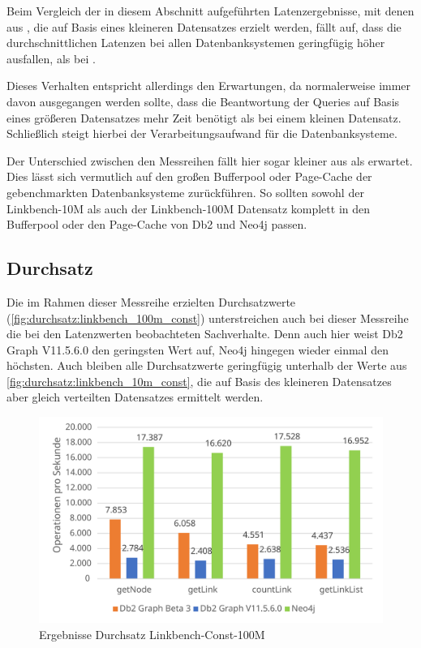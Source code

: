 Beim Vergleich der in diesem Abschnitt aufgeführten Latenzergebnisse, mit denen aus , die auf Basis eines kleineren Datensatzes erzielt werden, fällt auf, dass die durchschnittlichen Latenzen bei allen Datenbanksystemen geringfügig höher ausfallen, als bei . 

Dieses Verhalten entspricht allerdings den Erwartungen, da normalerweise immer davon ausgegangen werden sollte, dass die Beantwortung der Queries auf Basis eines größeren Datensatzes mehr Zeit benötigt als bei einem kleinen Datensatz. Schließlich steigt hierbei der Verarbeitungsaufwand für die Datenbanksysteme. 

Der Unterschied zwischen den Messreihen fällt hier sogar kleiner aus als erwartet. Dies lässt sich vermutlich auf den großen Bufferpool oder Page-Cache der gebenchmarkten Datenbanksysteme zurückführen. So sollten sowohl der Linkbench-10M als auch der Linkbench-100M Datensatz komplett in den Bufferpool oder den Page-Cache von Db2 und Neo4j passen.

\subsection{Durchsatz}
Die im Rahmen dieser Messreihe erzielten Durchsatzwerte (\autoref{fig:durchsatz:linkbench_100m_const}) unterstreichen auch bei dieser Messreihe die bei den Latenzwerten beobachteten Sachverhalte. Denn auch hier weist Db2 Graph V11.5.6.0 den geringsten Wert auf, Neo4j hingegen wieder einmal den höchsten. Auch bleiben alle Durchsatzwerte geringfügig unterhalb der Werte aus \autoref{fig:durchsatz:linkbench_10m_const}, die auf Basis des kleineren Datensatzes aber gleich verteilten Datensatzes ermittelt werden. 

\begin{figure}[!ht]
    \centering
    \includegraphics[width=\textwidth]{images/diagramme/linkbench_100m_const_durchsatz.pdf}
    \caption{Ergebnisse Durchsatz Linkbench-Const-100M}
    \label{fig:durchsatz:linkbench_100m_const}
\end{figure}

